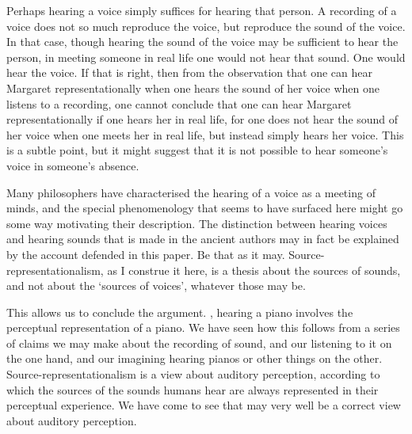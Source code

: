 \documentclass[sloppy, journal, git, bytitle, dodraft]{humapap}
\begin{document}

Perhaps hearing a voice simply suffices for hearing that person. A recording of a voice does not so much reproduce the voice, but reproduce the sound of the voice. In that case, though hearing the sound of the voice may be sufficient to hear the person, in meeting someone in real life one would not hear that sound. One would hear the voice. If that is right, then from the observation that one can hear Margaret representationally when one hears the sound of her voice when one listens to a recording, one cannot conclude that one can hear Margaret representationally if one hears her in real life, for one does not hear the sound of her voice when one meets her in real life, but instead simply hears her voice. This is a subtle point, but it might suggest that it is not possible to hear someone's voice in someone's absence. 

Many philosophers have characterised the hearing of a voice as a meeting of minds, and the special phenomenology that seems to have surfaced here might go some way motivating their description. The distinction between hearing voices and hearing sounds that is made in the ancient authors may in fact be explained by the account defended in this paper. Be that as it may. Source-representationalism, as I construe it here, is a thesis about the sources of sounds, and not about the `sources of voices', whatever those may be.


\sect This allows us to conclude the argument. %
, hearing a piano involves the perceptual representation of a piano. We have seen how this follows from a series of claims we may make about the recording of sound, and our listening to it on the one hand, and our imagining hearing pianos or other things on the other. Source-representationalism is a view about auditory perception, according to which the sources of the sounds humans hear are always represented in their perceptual experience. We have come to see that may very well be a correct view about auditory perception.
\end{document}
